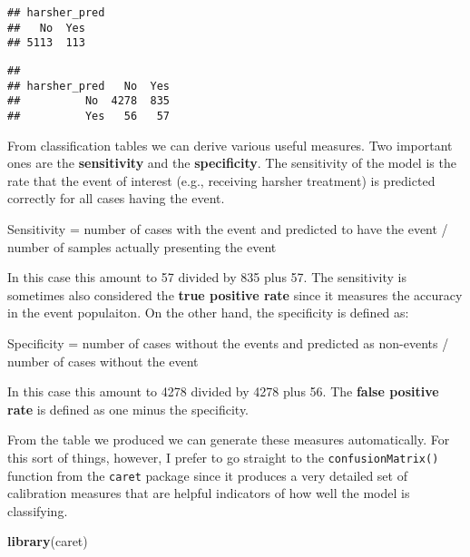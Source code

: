 \documentclass[
]{book}
\newenvironment{Shaded}{\begin{snugshade}}{\end{snugshade}}
\newcommand{\CommentTok}[1]{\textcolor[rgb]{0.56,0.35,0.01}{\textit{#1}}}
\newcommand{\FunctionTok}[1]{\textcolor[rgb]{0.13,0.29,0.53}{\textbf{#1}}}
\newcommand{\NormalTok}[1]{#1}
\newcommand{\OtherTok}[1]{\textcolor[rgb]{0.56,0.35,0.01}{#1}}
\newcommand{\SpecialCharTok}[1]{\textcolor[rgb]{0.81,0.36,0.00}{\textbf{#1}}}
\begin{document}
\begin{verbatim}
## harsher_pred
##   No  Yes 
## 5113  113
\end{verbatim}

\begin{Shaded}
\end{Shaded}

\begin{verbatim}
##             
## harsher_pred   No  Yes
##          No  4278  835
##          Yes   56   57
\end{verbatim}

From classification tables we can derive various useful measures. Two important ones are the \textbf{sensitivity} and the \textbf{specificity}. The sensitivity of the model is the rate that the event of interest (e.g., receiving harsher treatment) is predicted correctly for all cases having the event.

Sensitivity = number of cases with the event and predicted to have the event / number of samples actually presenting the event

In this case this amount to 57 divided by 835 plus 57. The sensitivity is sometimes also considered the \textbf{true positive rate} since it measures the accuracy in the event populaiton. On the other hand, the specificity is defined as:

Specificity = number of cases without the events and predicted as non-events / number of cases without the event

In this case this amount to 4278 divided by 4278 plus 56. The \textbf{false positive rate} is defined as one minus the specificity.

From the table we produced we can generate these measures automatically. For this sort of things, however, I prefer to go straight to the \texttt{confusionMatrix()} function from the \texttt{caret} package since it produces a very detailed set of calibration measures that are helpful indicators of how well the model is classifying.

\begin{Shaded}
\begin{Highlighting}[]
\FunctionTok{library}\NormalTok{(caret)}
\end{Highlighting}
\end{Shaded}
\end{document}
